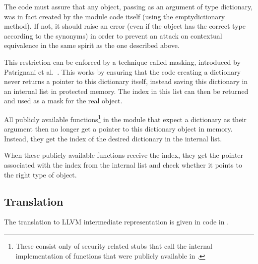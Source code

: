 The code must assure that any object, passing as an argument of type dictionary, was in fact created by the module code itself (using the emptydictionary method). If not, it should raise an error (even if the object has the correct type according to the synonyms) in order to prevent an attack on contextual equivalence in the same spirit as the one described above.

This restriction can be enforced by a technique called masking, introduced by Patrignani et al.~\cite{Patrignani}. 
This works by ensuring that the code creating a dictionary never returns a pointer to this dictionary itself, instead saving this dictionary in an internal list in protected memory.
The index in this list can then be returned and used as a mask for the real object.

All publicly available functions\footnote{These consist only of security related stubs that call the internal implementation of functions that were publicly available in \MiniML.} in the module that expect a dictionary as their argument then no longer get a pointer to this dictionary object in memory. 
Instead, they get the index of the desired dictionary in the internal list.

When these publicly available functions receive the index, they get the pointer associated with the index from the internal list and check whether it points to the right type of object.



\subsection{Translation}
The translation to LLVM intermediate representation is given in code in .

